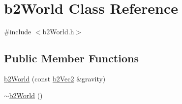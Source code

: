 \hypertarget{classb2_world}{}\section{b2\+World Class Reference}
\label{classb2_world}


{\ttfamily \#include $<$b2\+World.\+h$>$}

\subsection*{Public Member Functions}
\begin{DoxyCompactItemize}
\item 
\hyperlink{classb2_world_aeccc87fd9e36702c821a8244ca7cd875}{b2\+World} (const \hyperlink{structb2_vec2}{b2\+Vec2} \&gravity)
\item 
\hyperlink{classb2_world_a5250ae4487475c33ccefdead07c768c8}{$\sim$b2\+World} ()\hypertarget{classb2_world_a5250ae4487475c33ccefdead07c768c8}{}\label{classb2_world_a5250ae4487475c33ccefdead07c768c8}


\end{DoxyCompactItemize}
